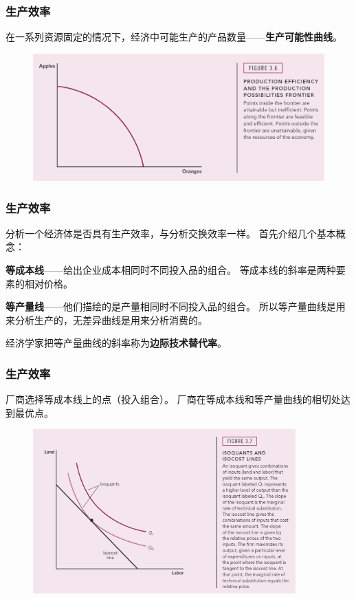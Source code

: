 \documentclass[aspectratio=169, 12pt]{beamer}
\begin{document}
\begin{frame}[plain]
    \frametitle{生产效率}
    在一系列资源固定的情况下，经济中可能生产的产品数量——\textbf{生产可能性曲线}。
    \begin{figure}
        \centering
        \begin{minipage}{1.0\linewidth}
            \centering
            \includegraphics[width=1.0\textwidth]{./resources/figure/propos.png}
        \end{minipage}
    \end{figure}
\end{frame}

\begin{frame}[plain]
    \frametitle{生产效率}
    分析一个经济体是否具有生产效率，与分析交换效率一样。
    首先介绍几个基本概念：\par
    \textbf{等成本线}——给出企业成本相同时不同投入品的组合。
    等成本线的斜率是两种要素的相对价格。\par
    \textbf{等产量线}——他们描绘的是产量相同时不同投入品的组合。
    所以等产量曲线是用来分析生产的，无差异曲线是用来分析消费的。
    \par
    经济学家把等产量曲线的斜率称为\textbf{边际技术替代率}。
\end{frame}

\begin{frame}[plain]
    \frametitle{生产效率}
    厂商选择等成本线上的点（投入组合）。
    厂商在等成本线和等产量曲线的相切处达到最优点。
    \begin{figure}
        \centering
            \includegraphics[width=0.9\textwidth]{./resources/figure/production.png}
    \end{figure}
\end{frame}
\end{document}
